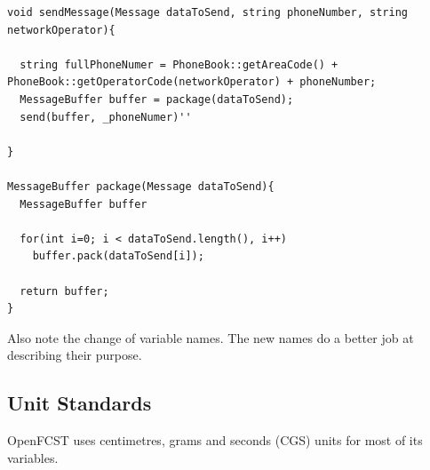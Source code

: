        \begin{center}
      \begin{lstlisting}
void sendMessage(Message dataToSend, string phoneNumber, string networkOperator){
  
  string fullPhoneNumer = PhoneBook::getAreaCode() + PhoneBook::getOperatorCode(networkOperator) + phoneNumber;
  MessageBuffer buffer = package(dataToSend);
  send(buffer, _phoneNumer)''
  
}

MessageBuffer package(Message dataToSend){
  MessageBuffer buffer
  
  for(int i=0; i < dataToSend.length(), i++)
    buffer.pack(dataToSend[i]);

  return buffer;
}
      \end{lstlisting}
      \end{center}
      
      Also note the change of variable names. The new names do a better job at describing their purpose.
      
\subsection{Unit Standards}
OpenFCST uses centimetres, grams and seconds (CGS) units for most of its variables.

  
